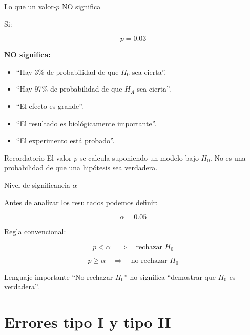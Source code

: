 \documentclass[11pt, aspectratio=169]{beamer}
\begin{document}
\begin{frame}{Lo que un valor-$p$ NO significa}

Si:

\[
p=0.03
\]

\textbf{NO significa:}

\begin{itemize}
    \item ``Hay 3\% de probabilidad de que $H_0$ sea cierta''.
    \item ``Hay 97\% de probabilidad de que $H_A$ sea cierta''.
    \item ``El efecto es grande''.
    \item ``El resultado es biológicamente importante''.
    \item ``El experimento está probado''.
\end{itemize}

\pause

\begin{alertblock}{Recordatorio}
El valor-$p$ se calcula suponiendo un modelo bajo $H_0$.
No es una probabilidad de que una hipótesis sea verdadera.
\end{alertblock}

\end{frame}

\begin{frame}{Nivel de significancia $\alpha$}

Antes de analizar los resultados podemos definir:

\[
\alpha=0.05
\]

Regla convencional:

\[
p<\alpha
\quad\Rightarrow\quad
\text{rechazar }H_0
\]

\[
p\geq\alpha
\quad\Rightarrow\quad
\text{no rechazar }H_0
\]

\begin{alertblock}{Lenguaje importante}
``No rechazar $H_0$'' no significa ``demostrar que $H_0$ es verdadera''.
\end{alertblock}

\end{frame}

\section{Errores tipo I y tipo II}
\end{document}

